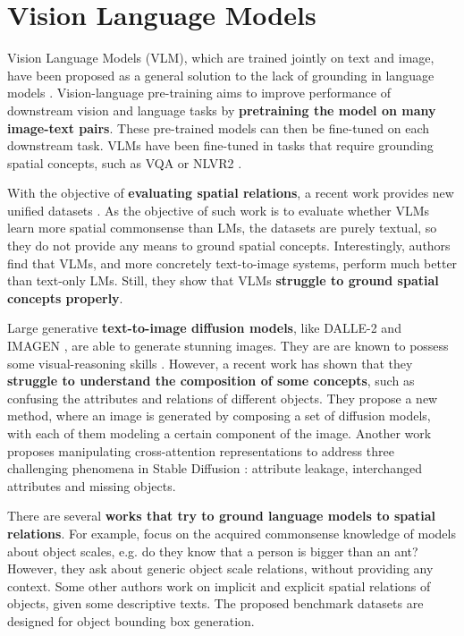 \section{Vision Language Models} \label{sec:vision_language_models}

Vision Language Models (VLM), which are trained jointly on text and image, have been proposed as a general solution to the lack of grounding in language models \cite{lu2019vilbert, tan2020lxmert, ramesh2022hierarchical, saharia2022photorealistic}. Vision-language pre-training aims to improve performance of downstream vision and language tasks by \textbf{pretraining the model on many image-text pairs}. These pre-trained models can then be fine-tuned on each downstream task. VLMs have been fine-tuned in tasks that require grounding spatial concepts, such as VQA \cite{antol2015vqa} or NLVR2 \cite{suhr2018corpus}.

With the objective of \textbf{evaluating spatial relations}, a recent work provides new unified datasets \cite{liu2022things}. As the objective of such work is to evaluate whether VLMs learn more spatial commonsense than LMs, the datasets are purely textual, so they do not provide any means to ground spatial concepts. Interestingly, authors find that VLMs, and more concretely text-to-image systems, perform much better than text-only LMs. Still, they show that VLMs \textbf{struggle to ground spatial concepts properly}.

Large generative \textbf{text-to-image diffusion models}, like DALLE-2 \cite{ramesh2022hierarchical} and IMAGEN \cite{saharia2022photorealistic}, are able to generate stunning images. They are are known to possess some visual-reasoning skills \cite{cho2022dall}. However, a recent work \cite{liu2022compositional} has shown that they \textbf{struggle to understand the composition of some concepts}, such as confusing the attributes and relations of different objects. They propose a new method, where an image is generated by composing a set of diffusion models, with each of them modeling a certain component of the image. Another work \cite{anonymous2023trainingfree} proposes manipulating cross-attention representations to address three challenging phenomena in Stable Diffusion \cite{rombach2021highresolution}: attribute leakage, interchanged attributes and missing objects.

There are several \textbf{works that try to ground language models to spatial relations}. For example, \cite{bagherinezhad2016elephants, elazar2019large} focus on the acquired commonsense knowledge of models about object scales, e.g. do they know that a person is bigger than an ant? However, they ask about generic object scale relations, without providing any context. Some other authors \cite{collell2018acquiring, elu2021inferring} work on implicit and explicit spatial relations of objects, given some descriptive texts. The proposed benchmark datasets are designed for object bounding box generation.

